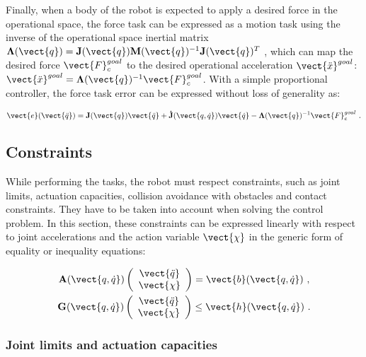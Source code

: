Finally, when a body of the robot is expected to apply a desired force in the operational space, the force task can be expressed as a motion task using the inverse of the operational space inertial matrix $\mathbf{\Lambda}(\vect{q}) = \mathbf{J}(\vect{q})\mathbf{M}(\vect{q})^{-1}\mathbf{J}(\vect{q})^T$ \cite{khatib1995, chang1999}, which  can map the desired force $\vect{F}_{c}^{goal}$ to the desired operational acceleration $\vect{\ddot{x}}^{goal}$: $\vect{\ddot{x}}^{goal}=\mathbf{\Lambda}(\vect{q})^{-1}\vect{F}_{c}^{goal}$. With a simple proportional controller, the force task error can be expressed without loss of generality as:
\begin{singlespace}
\begin{equation}\label{eq:wrench task definition}
\vect{e}(\vect{\ddot{q}}) = \mathbf{J}(\vect{q})\vect{\ddot{q}} + \mathbf{\dot{J}}(\vect{q,\dot{q}})\vect{\dot{q}} - \mathbf{\Lambda}(\vect{q})^{-1}\vect{F}_{c}^{goal} ~.
\end{equation}
\end{singlespace}


\subsection{Constraints}
While performing the tasks, the robot must respect constraints, such as joint limits, actuation capacities, collision avoidance with obstacles and contact constraints. They have to be taken into account when solving the control problem. In this section, these constraints can be expressed linearly with respect to joint accelerations and the action variable $\vect{\chi}$ in the generic form of equality or inequality equations:
\begin{singlespace}
\begin{gather}
\mathbf{A}(\vect{q, \dot{q}})\left( \begin{array}{c} \vect{\ddot{q}} \\ \vect{\chi} \end{array} \right) = \vect{b}(\vect{q, \dot{q}}) ~, \label{eq:eq cons} \\
\mathbf{G}(\vect{q, \dot{q}})\left( \begin{array}{c} \vect{\ddot{q}} \\ \vect{\chi} \end{array} \right) \leq \vect{h}(\vect{q, \dot{q}}) ~ \label{eq:ineq cons}.
\end{gather}
\end{singlespace}


\subsubsection{Joint limits and actuation capacities} 

